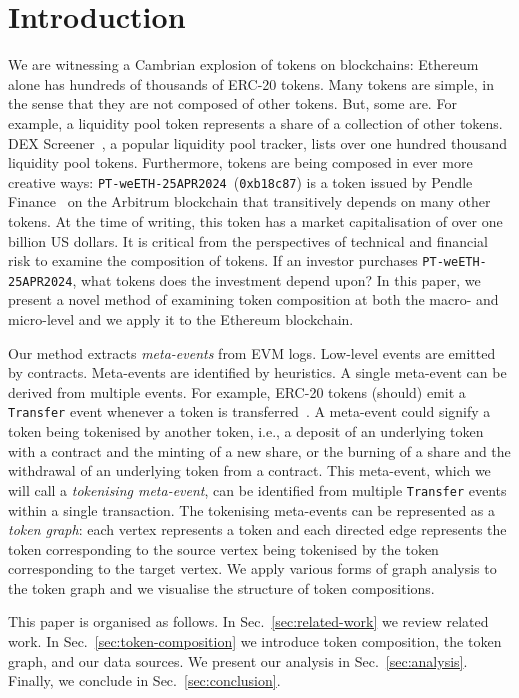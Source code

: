 \section{Introduction}\label{sec:introduction}

We are witnessing a Cambrian explosion of tokens on blockchains:
Ethereum alone has hundreds of thousands of ERC-20 tokens.  Many
tokens are simple, in the sense that they are not composed of other
tokens.  But, some are.  For example, a liquidity pool token
represents a share of a collection of other tokens.  DEX
Screener~\cite{dex-screener-xx}, a popular liquidity pool tracker,
lists over one hundred thousand liquidity pool tokens.  Furthermore,
tokens are being composed in ever more creative ways:
\texttt{PT-weETH-25APR2024}~(\texttt{0xb18c87}) is a token issued by
Pendle Finance~\cite{nguyen-vuong-22} on the Arbitrum blockchain that
transitively depends on many other tokens.  At the time of writing,
this token has a market capitalisation of over one billion US dollars.
It is critical from the perspectives of technical and financial risk
to examine the composition of tokens.  If an investor purchases
\texttt{PT-weETH-25APR2024}, what tokens does the investment depend
upon?  In this paper, we present a novel method of examining token
composition at both the macro- and micro-level and we apply it to the
Ethereum blockchain.

Our method extracts \textit{meta-events} from EVM logs.  Low-level
events are emitted by contracts.  Meta-events are identified by
heuristics.  A single meta-event can be derived from multiple events.
For example, ERC-20 tokens (should) emit a \texttt{Transfer} event
whenever a token is transferred~\cite{vogelsteller-buterin-15}.  A
meta-event could signify a token being tokenised by another token,
i.e., a deposit of an underlying token with a contract and the minting
of a new share, or the burning of a share and the withdrawal of an
underlying token from a contract.  This meta-event, which we will call
a \textit{tokenising meta-event}, can be identified from multiple
\texttt{Transfer} events within a single transaction.  The tokenising
meta-events can be represented as a \textit{token graph}: each vertex
represents a token and each directed edge represents the token
corresponding to the source vertex being tokenised by the token
corresponding to the target vertex.  We apply various forms of graph
analysis to the token graph and we visualise the structure of token
compositions.

This paper is organised as follows.  In Sec.~\ref{sec:related-work} we
review related work.  In Sec.~\ref{sec:token-composition} we introduce
token composition, the token graph, and our data sources.  We present
our analysis in Sec.~\ref{sec:analysis}.  Finally, we conclude in
Sec.~\ref{sec:conclusion}.
